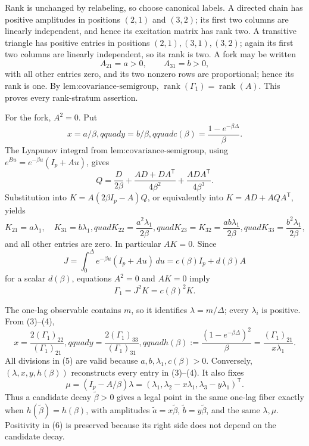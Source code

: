 Rank is unchanged by relabeling, so choose canonical labels.  A directed chain has positive amplitudes in positions \((2,1)\) and \((3,2)\); its first two columns are linearly independent, and hence its excitation matrix has rank two.  A transitive triangle has positive entries in positions \((2,1),(3,1),(3,2)\); again its first two columns are linearly independent, so its rank is two.  A fork may be written
\[
 A_{21}=a>0,\qquad A_{31}=b>0,
\]
with all other entries zero, and its two nonzero rows are proportional; hence its rank is one.  By \(\text{lem:covariance-semigroup}\), \(\operatorname{rank}(\Gamma_1)=\operatorname{rank}(A)\).  This proves every rank-stratum assertion.

For the fork, \(A^2=0\).  Put
\[
 x=a/\beta,qquad y=b/\beta,qquad
 c(\beta)=\frac{1-e^{-\beta\Delta}}{\beta}.
\tag{1}
\]
The Lyapunov integral from \(\text{lem:covariance-semigroup}\), using \(e^{Bu}=e^{-\beta u}(I_p+Au)\), gives
\[
 Q=\frac{D}{2\beta}+\frac{AD+DA^{\mathsf T}}{4\beta^2}
   +\frac{ADA^{\mathsf T}}{4\beta^3}.
\tag{2}
\]
Substitution into \(K=A(2\beta I_p-A)Q\), or equivalently into \(K=AD+AQA^{\mathsf T}\), yields
\[
 K_{21}=a\lambda_1,\quad K_{31}=b\lambda_1,quad
 K_{22}=\frac{a^2\lambda_1}{2\beta},quad
 K_{23}=K_{32}=\frac{ab\lambda_1}{2\beta},quad
 K_{33}=\frac{b^2\lambda_1}{2\beta},
\tag{3}
\]
and all other entries are zero.  In particular \(AK=0\).  Since
\[
 J=\int_0^\Delta e^{-\beta u}(I_p+Au)\,du=c(\beta)I_p+d(\beta)A
\]
for a scalar \(d(\beta)\), equations \(A^2=0\) and \(AK=0\) imply
\[
 \Gamma_1=J^2K=c(\beta)^2K.
\tag{4}
\]

The one-lag observable contains \(m\), so it identifies \(\lambda=m/\Delta\); every \(\lambda_i\) is positive.  From (3)--(4),
\[
 x=\frac{2(\Gamma_1)_{22}}{(\Gamma_1)_{21}},qquad
 y=\frac{2(\Gamma_1)_{33}}{(\Gamma_1)_{31}},qquad
 h(\beta):=\frac{(1-e^{-\beta\Delta})^2}{\beta}
 =\frac{(\Gamma_1)_{21}}{x\lambda_1}.
\tag{5}
\]
All divisions in (5) are valid because \(a,b,\lambda_1,c(\beta)>0\).  Conversely, \((\lambda,x,y,h(\beta))\) reconstructs every entry in (3)--(4).  It also fixes
\[
 \mu=(I_p-A/\beta)\lambda
 =(\lambda_1,\lambda_2-x\lambda_1,\lambda_3-y\lambda_1)^{\mathsf T}.
\tag{6}
\]
Thus a candidate decay \(\widetilde\beta>0\) gives a legal point in the same one-lag fiber exactly when \(h(\widetilde\beta)=h(\beta)\), with amplitudes \(\widetilde a=x\widetilde\beta\), \(\widetilde b=y\widetilde\beta\), and the same \(\lambda,\mu\).  Positivity in (6) is preserved because its right side does not depend on the candidate decay.

